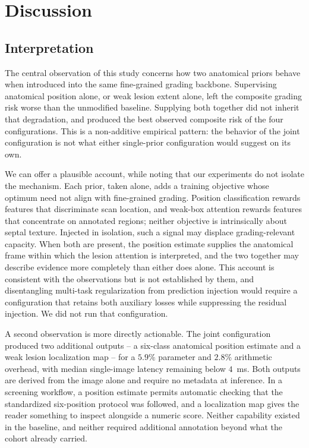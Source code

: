 \section{Discussion}
\label{sec:discussion}

\subsection{Interpretation}

The central observation of this study concerns how two anatomical priors behave
when introduced into the same fine-grained grading backbone. Supervising
anatomical position alone, or weak lesion extent alone, left the composite
grading risk worse than the unmodified baseline. Supplying both together did not
inherit that degradation, and produced the best observed composite risk of the
four configurations. This is a non-additive empirical pattern: the behavior of
the joint configuration is not what either single-prior configuration would
suggest on its own.

We can offer a plausible account, while noting that our experiments do not
isolate the mechanism. Each prior, taken alone, adds a training objective whose
optimum need not align with fine-grained grading. Position classification
rewards features that discriminate scan location, and weak-box attention rewards
features that concentrate on annotated regions; neither objective is
intrinsically about septal texture. Injected in isolation, such a signal may
displace grading-relevant capacity. When both are present, the position estimate
supplies the anatomical frame within which the lesion attention is interpreted,
and the two together may describe evidence more completely than either does
alone. This account is consistent with the observations but is not established
by them, and disentangling multi-task regularization from prediction injection
would require a configuration that retains both auxiliary losses while
suppressing the residual injection. We did not run that configuration.

A second observation is more directly actionable. The joint configuration
produced two additional outputs -- a six-class anatomical position estimate and
a weak lesion localization map -- for a $5.9\%$ parameter and $2.8\%$ arithmetic
overhead, with median single-image latency remaining below $4$~ms. Both outputs
are derived from the image alone and require no metadata at inference. In a
screening workflow, a position estimate permits automatic checking that the
standardized six-position protocol was followed, and a localization map gives
the reader something to inspect alongside a numeric score. Neither capability
existed in the baseline, and neither required additional annotation beyond what
the cohort already carried.

